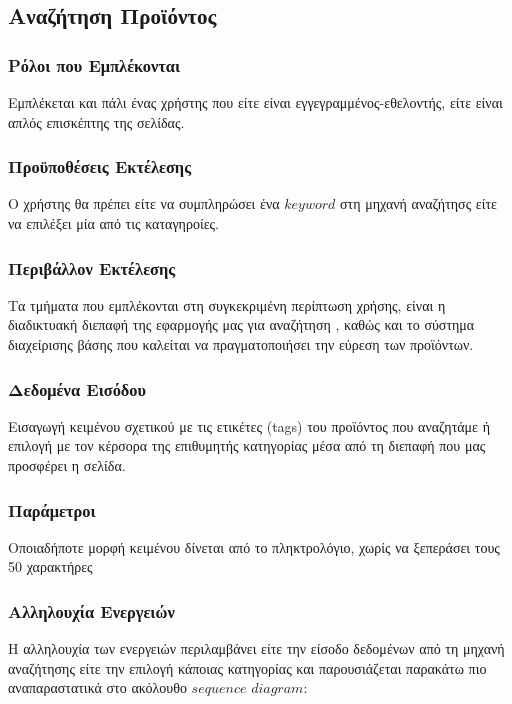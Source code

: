 \documentclass[12pt]{article}
\begin{document}
\subsection{Αναζήτηση Προϊόντος}

\subsubsection{Ρόλοι που Εμπλέκονται}

Εμπλέκεται και πάλι ένας χρήστης που είτε  είναι εγγεγραμμένος-εθελοντής, είτε είναι απλός επισκέπτης της σελίδας.
\subsubsection{Προϋποθέσεις Εκτέλεσης}

Ο χρήστης θα πρέπει είτε να συμπληρώσει ένα $keyword$ στη μηχανή αναζήτησς είτε να επιλέξει μία από τις καταγηροίες.

\subsubsection{Περιβάλλον Εκτέλεσης}

Τα τμήματα που εμπλέκονται στη συγκεκριμένη περίπτωση χρήσης, είναι η διαδικτυακή διεπαφή της εφαρμογής μας για αναζήτηση , καθώς και το σύστημα διαχείρισης βάσης που καλείται να πραγματοποιήσει την εύρεση των προϊόντων. 

\subsubsection{Δεδομένα Εισόδου}

Εισαγωγή κειμένου σχετικού με τις ετικέτες (tags) του προϊόντος που αναζητάμε ή επιλογή με τον κέρσορα της επιθυμητής κατηγορίας μέσα από τη διεπαφή που μας προσφέρει η σελίδα.

\subsubsection{Παράμετροι}

Οποιαδήποτε μορφή κειμένου δίνεται από το πληκτρολόγιο, χωρίς να ξεπεράσει τους 50 χαρακτήρες

\subsubsection{Αλληλουχία Ενεργειών}

Η αλληλουχία των ενεργειών περιλαμβάνει είτε την είσοδο δεδομένων από τη μηχανή αναζήτησης είτε την επιλογή κάποιας κατηγορίας και παρουσιάζεται παρακάτω πιο αναπαραστατικά στο ακόλουθο $sequence$ $diagram$:
\end{document}
